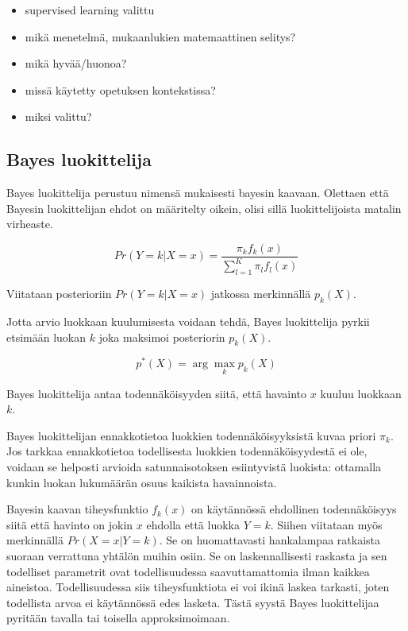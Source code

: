 \documentclass[finnish,twoside,openright]{HYgraduMLDS}
\begin{document}
\begin{itemize}
    \item supervised learning valittu
\end{itemize}

\begin{itemize}
    \item mikä menetelmä, mukaanlukien matemaattinen selitys?
    \item mikä hyvää/huonoa?
    \item missä käytetty opetuksen kontekstissa?
    \item miksi valittu?
\end{itemize}

\subsection{Bayes luokittelija}

Bayes luokittelija perustuu nimensä mukaisesti bayesin kaavaan\cite{james2013ISLR}. Olettaen että Bayesin luokittelijan ehdot on määritelty oikein, olisi sillä luokittelijoista matalin virheaste\cite{james2013ISLR}.

\begin{equation} \label{eq:bayes}
    Pr(Y = k | X = x) = \frac{\pi_k f_k(x)}{\sum^K_{l=1} \pi_l f_l(x)}
\end{equation}

Viitataan posterioriin $Pr(Y = k | X = x)$ jatkossa merkinnällä $p_k(X)$.

Jotta arvio luokkaan kuulumisesta voidaan tehdä, Bayes luokittelija pyrkii etsimään luokan $k$ joka maksimoi posteriorin $p_k(X)$. 

\begin{equation}
    p^*(X) = \arg \max_k p_k(X)
\end{equation}

Bayes luokittelija antaa todennäköisyyden siitä, että havainto $x$ kuuluu luokkaan $k$.

Bayes luokittelijan ennakkotietoa luokkien todennäköisyyksistä kuvaa priori $\pi_k$. Jos tarkkaa ennakkotietoa todellisesta luokkien todennäköisyydestä ei ole, voidaan se helposti arvioida satunnaisotoksen esiintyvistä luokista: ottamalla kunkin luokan lukumäärän osuus kaikista havainnoista. 

Bayesin kaavan tiheysfunktio $f_k(x)$ on käytännössä ehdollinen todennäköisyys siitä että havinto on jokin $x$ ehdolla että luokka $Y = k$. Siihen viitataan myös merkinnällä $Pr(X = x | Y = k)$. Se on huomattavasti hankalampaa ratkaista suoraan verrattuna yhtälön muihin osiin. Se on laskennallisesti raskasta ja sen todelliset parametrit ovat todellisuudessa saavuttamattomia ilman kaikkea aineistoa. Todellisuudessa siis tiheysfunktiota ei voi ikinä laskea tarkasti, joten todellista arvoa ei käytännössä edes lasketa. Tästä syystä Bayes luokittelijaa pyritään tavalla tai toisella approksimoimaan\cite{james2013ISLR}.
\end{document}
